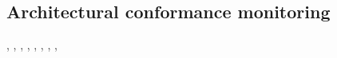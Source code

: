 \subsection{Architectural conformance monitoring}
\cite{aldrich_archjava_2002}, \cite{abi-antoun_analyzing_2010}, \cite{luckham_event-based_1995}, \cite{abi-antoun_static_2009}, \cite{de_silva_controlling_2012}, \cite{knodel_comparison_2007}, \cite{jansen_documenting_2008}, \cite{hong_yan_discotect_2004}, 

\subsection{}



